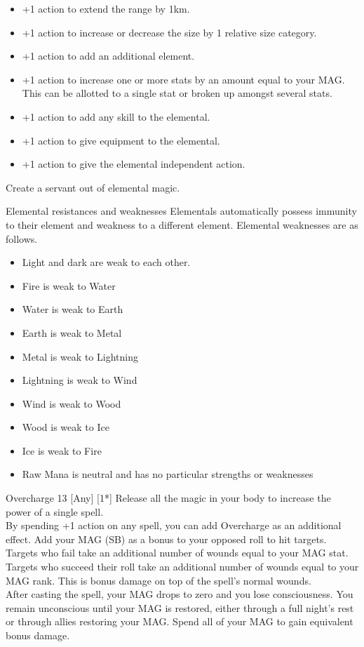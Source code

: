 \begin{pathele}
{\begin{itemize}
\item +1 action to extend the range by 1km.
\item +1 action to increase or decrease the size by 1 relative size category.
\item +1 action to add an additional element.
\item +1 action to increase one or more stats by an amount equal to your MAG. This can be allotted to a single stat or broken up amongst several stats.
\item +1 action to add any skill to the elemental.
\item +1 action to give equipment to the elemental.
\item +1 action to give the elemental independent action.
\end{itemize}
}
{Create a servant out of elemental magic.}
\begin{paperbox}{Elemental resistances and weaknesses}
Elementals automatically possess immunity to their element and weakness to a different element. Elemental weaknesses are as follows.
\begin{itemize}
\item Light and dark are weak to each other.
\item Fire is weak to Water
\item Water is weak to Earth
\item Earth is weak to Metal
\item Metal is weak to Lightning
\item Lightning is weak to Wind
\item Wind is weak to Wood
\item Wood is weak to Ice
\item Ice is weak to Fire
\item Raw Mana is neutral and has no particular strengths or weaknesses
\end{itemize}
\end{paperbox}

\spelldescription
{Overcharge}
{13}
[Any]
[1*]
{Release all the magic in your body to increase the power of a single spell.\\By spending +1 action on any spell, you can add Overcharge as an additional effect. Add your MAG (SB) as a bonus to your opposed roll to hit targets. Targets who fail take an additional number of wounds equal to your MAG stat. Targets who succeed their roll take an additional number of wounds equal to your MAG rank. This is bonus damage on top of the spell's normal wounds.\\After casting the spell, your MAG drops to zero and you lose consciousness. You remain unconscious until your MAG is restored, either through a full night's rest or through allies restoring your MAG.}
{Spend all of your MAG to gain equivalent bonus damage.}

\end{pathele}
